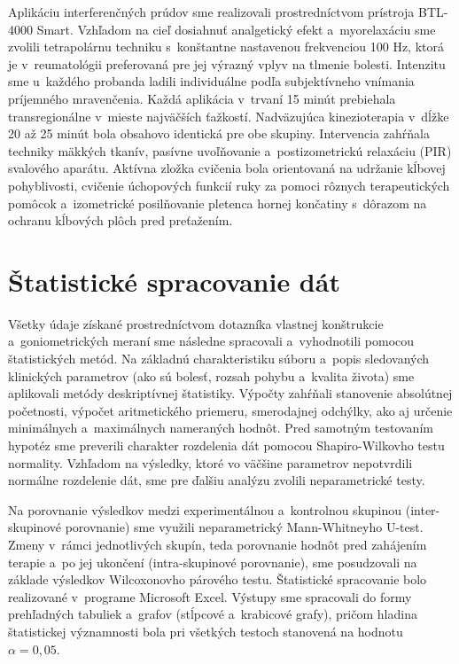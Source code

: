 Aplikáciu interferenčných prúdov sme realizovali prostredníctvom prístroja BTL-4000 Smart. Vzhľadom na cieľ dosiahnuť analgetický efekt a~myorelaxáciu sme zvolili tetrapolárnu techniku s~konštantne nastavenou frekvenciou 100 Hz, ktorá je v~reumatológii preferovaná pre jej výrazný vplyv na tlmenie bolesti. Intenzitu sme u~každého probanda ladili individuálne podľa subjektívneho vnímania príjemného mravenčenia. Každá aplikácia v~trvaní 15 minút prebiehala transregionálne v~mieste najväčších ťažkostí. Nadväzujúca kinezioterapia v~dĺžke 20 až 25 minút bola obsahovo identická pre obe skupiny. Intervencia zahŕňala techniky mäkkých tkanív, pasívne uvoľňovanie a~postizometrickú relaxáciu (PIR) svalového aparátu. Aktívna zložka cvičenia bola orientovaná na udržanie kĺbovej pohyblivosti, cvičenie úchopových funkcií ruky za pomoci rôznych terapeutických pomôcok a~izometrické posilňovanie pletenca hornej končatiny s~dôrazom na ochranu kĺbových plôch pred preťažením.

\section{Štatistické spracovanie dát}

Všetky údaje získané prostredníctvom dotazníka vlastnej konštrukcie a~goniometrických meraní sme následne spracovali a~vyhodnotili pomocou štatistických metód. Na základnú charakteristiku súboru a~popis sledovaných klinických parametrov (ako sú bolesť, rozsah pohybu a~kvalita života) sme aplikovali metódy deskriptívnej štatistiky. Výpočty zahŕňali stanovenie absolútnej početnosti, výpočet aritmetického priemeru, smerodajnej odchýlky, ako aj určenie minimálnych a~maximálnych nameraných hodnôt. Pred samotným testovaním hypotéz sme preverili charakter rozdelenia dát pomocou Shapiro-Wilkovho testu normality. Vzhľadom na výsledky, ktoré vo väčšine parametrov nepotvrdili normálne rozdelenie dát, sme pre ďalšiu analýzu zvolili neparametrické testy.

Na porovnanie výsledkov medzi experimentálnou a~kontrolnou skupinou (inter-skupinové porovnanie) sme využili neparametrický Mann-Whitneyho U-test. Zmeny v~rámci jednotlivých skupín, teda porovnanie hodnôt pred zahájením terapie a~po jej ukončení (intra-skupinové porovnanie), sme posudzovali na základe výsledkov Wilcoxonovho párového testu. Štatistické spracovanie bolo realizované v~programe Microsoft Excel. Výstupy sme spracovali do formy prehľadných tabuliek a~grafov (stĺpcové a~krabicové grafy), pričom hladina štatistickej významnosti bola pri všetkých testoch stanovená na hodnotu $\alpha = 0,05$.

